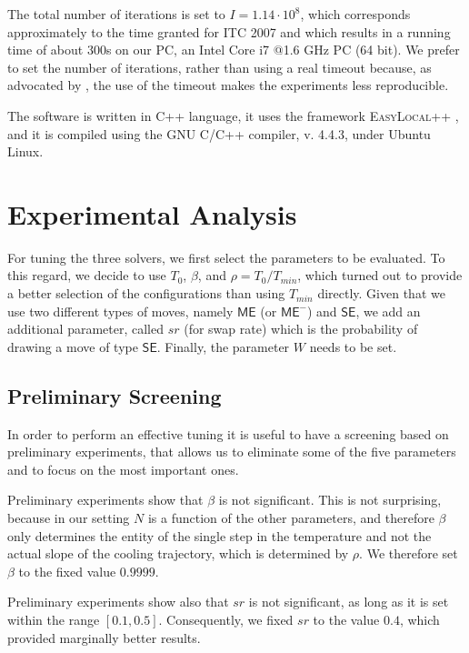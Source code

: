 \documentclass[authoryear,preprint,a4paper,12pt]{elsarticle}
\begin{document}
The total number of iterations is set to $I = 1.14\cdot 10^8$, which
corresponds approximately to the time granted for ITC 2007 and which
results in a running time of about 300s on our PC, an Intel Core i7 @1.6 GHz
PC (64 bit). We prefer to set the number of iterations, rather than
using a real timeout because, as advocated by \citet{John96}, the use
of the timeout makes the experiments less reproducible.

The software is written in C++ language, it uses the framework
\textsc{EasyLocal++} \citep{DiSc03b}, and it is compiled using the GNU
C/C++ compiler, v. 4.4.3, under Ubuntu Linux. 

\section{Experimental Analysis}
\label{sec:exper-analys}


For tuning the three solvers, we first select the parameters to be
evaluated.  To this regard, we decide to use $T_0$, $\beta$, and $\rho
= T_0/T_{min}$, which turned out to provide a better selection of the
configurations than using $T_{min}$ directly. Given that we use two
different types of moves, namely $\mathsf{ME}$ (or $\mathsf{ME^-}$)
and $\mathsf{SE}$, we add an additional parameter, called $sr$ (for
swap rate) which is the probability of drawing a move of type
$\mathsf{SE}$. Finally, the parameter $W$ needs to be set.

\subsection{Preliminary Screening}

In order to perform an effective tuning it is useful to have a screening
based on preliminary experiments, that allows us to eliminate some of
the five parameters and to focus on the most important ones.

Preliminary experiments show that $\beta$ is not significant. This is
not surprising, because in our setting $N$ is a function of the other
parameters, and therefore $\beta$ only determines the entity of the
single step in the temperature and not the actual slope of the cooling
trajectory, which is determined by $\rho$. We therefore set $\beta$
to the fixed value $0.9999$.

Preliminary experiments show also that $sr$ is not significant, as
long as it is set within the range $[0.1,0.5]$. Consequently, we fixed
$sr$ to the value $0.4$, which provided marginally better results.
\end{document}
